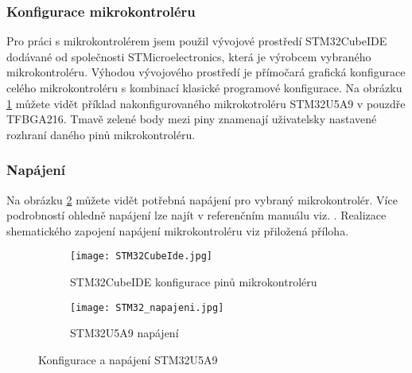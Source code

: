 	\subsubsection{Konfigurace mikrokontroléru}
	Pro práci s mikrokontrolérem jsem použil vývojové prostředí STM32CubeIDE dodávané od společnosti STMicroelectronics, která je výrobcem vybraného mikrokontroléru. Výhodou vývojového prostředí je přímočará grafická konfigurace celého mikrokontroléru s kombinací klasické programové konfigurace. Na obrázku \ref{fig:STM32CubeIde} můžete vidět příklad nakonfigurovaného mikrokotroléru STM32U5A9 v pouzdře TFBGA216. Tmavě zelené body mezi piny znamenají uživatelsky nastavené rozhraní daného pinů mikrokontroléru.
	
	\subsubsection{Napájení}
	Na obrázku \ref{fig:napajeni_stm32} můžete vidět potřebná napájení pro vybraný mikrokontrolér. Více podrobností ohledně napájení lze najít v referenčním manuálu viz. \cite{STM32U5A9_RM}. Realizace shematického zapojení napájení mikrokontroléru viz přiložená příloha. %
	\begin{figure}[h!]
		\begin{subfigure}{0.5\textwidth}
			\centering
			\captionsetup{justification=centering}
			\texttt{[image: STM32CubeIde.jpg]}
			\caption{STM32CubeIDE konfigurace pinů mikrokontroléru} 
			\label{fig:STM32CubeIde}
		\end{subfigure}
		\begin{subfigure}{0.5\textwidth}
				\centering
			\captionsetup{justification=centering}
			\texttt{[image: STM32\_napajeni.jpg]}
			\caption{STM32U5A9 napájení} 
			\label{fig:napajeni_stm32}
		\end{subfigure}
		\caption{Konfigurace a napájení STM32U5A9}
		\label{fig:konfig}
	\end{figure} 
